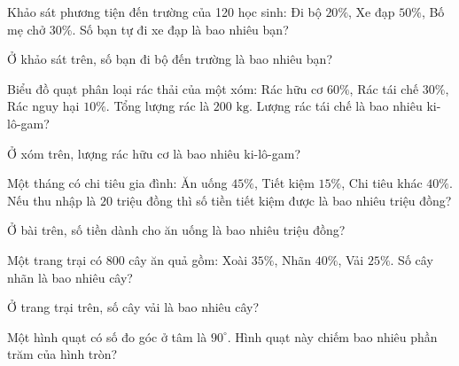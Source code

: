 \begin{ex}
  Khảo sát phương tiện đến trường của 120 học sinh: Đi bộ $20\%$, Xe đạp $50\%$, Bố mẹ chở $30\%$. Số bạn tự đi xe đạp là bao nhiêu bạn?
\end{ex}

\begin{ex}
  Ở khảo sát trên, số bạn đi bộ đến trường là bao nhiêu bạn?
\end{ex}

\begin{ex}
  Biểu đồ quạt phân loại rác thải của một xóm: Rác hữu cơ $60\%$, Rác tái chế $30\%$, Rác nguy hại $10\%$. Tổng lượng rác là $200\text{ kg}$. Lượng rác tái chế là bao nhiêu ki-lô-gam?
\end{ex}

\begin{ex}
  Ở xóm trên, lượng rác hữu cơ là bao nhiêu ki-lô-gam?
\end{ex}

\begin{ex}
  Một tháng có chi tiêu gia đình: Ăn uống $45\%$, Tiết kiệm $15\%$, Chi tiêu khác $40\%$. Nếu thu nhập là $20$ triệu đồng thì số tiền tiết kiệm được là bao nhiêu triệu đồng?
\end{ex}

\begin{ex}
  Ở bài trên, số tiền dành cho ăn uống là bao nhiêu triệu đồng?
\end{ex}

\begin{ex}
  Một trang trại có 800 cây ăn quả gồm: Xoài $35\%$, Nhãn $40\%$, Vải $25\%$. Số cây nhãn là bao nhiêu cây?
\end{ex}

\begin{ex}
  Ở trang trại trên, số cây vải là bao nhiêu cây?
\end{ex}

\begin{ex}
  Một hình quạt có số đo góc ở tâm là $90^\circ$. Hình quạt này chiếm bao nhiêu phần trăm của hình tròn?
\end{ex}
